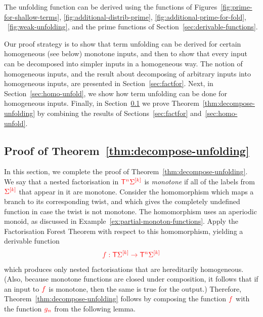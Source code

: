 \begin{theorem}\label{thm:decompose-unfolding}
The unfolding function can be derived using the functions of Figures~\ref{fig:prime-for-shallow-terms}, \ref{fig:additional-distrib-prime}, \ref{fig:additional-prime-for-fold}, ~\ref{fig:weak-unfolding}, and the prime functions of Section~\ref{sec:derivable-functions}.
\end{theorem}



Our proof strategy is to show that term unfolding can be derived for certain homogeneous (see below) monotone inputs, and then to show that every input can be decomposed into simpler inputs in a homogeneous way. The notion of homogeneous inputs, and the result about  decomposing of arbitrary inputs into homogeneous inputs, are presented in Section~\ref{sec:factfor}. Next, in Section~\ref{sec:homo-unfold}, we show how term unfolding can be done for homogeneous inputs. Finally, in Section~\ref{sec:monotone-unfold-proof} we prove Theorem~\ref{thm:decompose-unfolding} by combining  the results of Sections~\ref{sec:factfor} and~\ref{sec:homo-unfold}.




\subsection{Proof of Theorem~\ref{thm:decompose-unfolding}}
\label{sec:monotone-unfold-proof}
In this section, we complete the proof of Theorem~\ref{thm:decompose-unfolding}.  We say that a nested factorisation in ${\color{red}{\mathsf T}}^{{\color{red}{n}}} {\color{red}{\Sigma}}^{{\color{red}{[k]}}}$ is \emph{monotone} if all of the labels from ${\color{red}{\Sigma}}^{{\color{red}{[k]}}}$ that appear in it are monotone. 
Consider the homomorphism which maps a branch to its corresponding twist, and which gives the completely undefined function in case the twist is not monotone.  The homomorphism uses an aperiodic monoid, as discussed in Example~\ref{ex:partial-monoton-functions}. 
 Apply the Factorisation Forest Theorem with respect to this homomorphism, yielding a derivable function
\begin{align*}
{\color{red}{ f : {\color{red}{\mathsf T}}{\color{red}{\Sigma}}^{{\color{red}{[k]}}} \to {\color{red}{\mathsf T}}^{{\color{red}{n}}} {\color{red}{\Sigma}}^{{\color{red}{[k]}}}}}
\end{align*}
which produces only nested factorisations that are  hereditarily homogeneous. (Also, because monotone functions are closed under composition, it follows that if  an input to ${\color{red}{f}}$ is monotone, then the same is true for the output.) Therefore,  Theorem~\ref{thm:decompose-unfolding} follows by composing the function ${\color{red}{f}}$ with the function ${\color{red}{g_n}}$ from the following lemma. 

